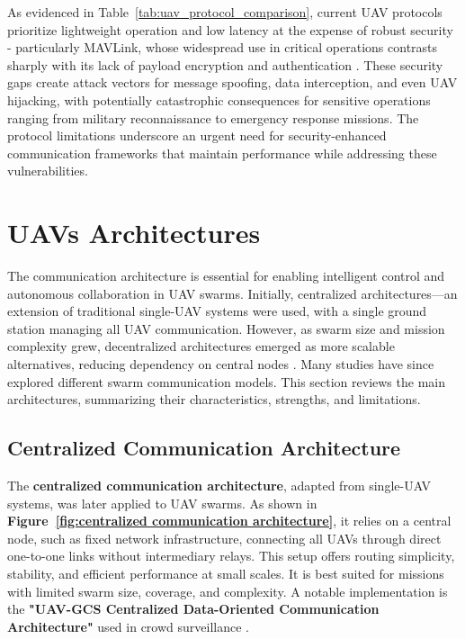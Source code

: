 As evidenced in Table~\ref{tab:uav_protocol_comparison}, current UAV protocols prioritize lightweight operation and low latency at the expense of robust security - particularly MAVLink, whose widespread use in critical operations contrasts sharply with its lack of payload encryption and authentication \cite{khan2020emerging}. These security gaps create attack vectors for message spoofing, data interception, and even UAV hijacking, with potentially catastrophic consequences for sensitive operations ranging from military reconnaissance to emergency response missions. The protocol limitations underscore an urgent need for security-enhanced communication frameworks that maintain performance while addressing these vulnerabilities.








\section{UAVs Architectures}



The communication architecture is essential for enabling intelligent control and autonomous collaboration in UAV swarms. Initially, centralized architectures—an extension of traditional single-UAV systems were used, with a single ground station managing all UAV communication. However, as swarm size and mission complexity grew, decentralized architectures emerged as more scalable alternatives, reducing dependency on central nodes \cite{Cao2012}. Many studies have since explored different swarm communication models. This section reviews the main architectures, summarizing their characteristics, strengths, and limitations.






\subsection{Centralized Communication Architecture}
\label{sec:centralized}

The \textbf{centralized communication architecture}, adapted from single-UAV systems, was later applied to UAV swarms. As shown in \textbf{Figure~\ref{fig:centralized communication architecture}}, it relies on a central node, such as fixed network infrastructure, connecting all UAVs through direct one-to-one links without intermediary relays. This setup offers routing simplicity, stability, and efficient performance at small scales. It is best suited for missions with limited swarm size, coverage, and complexity. A notable implementation is the \textbf{"UAV-GCS Centralized Data-Oriented Communication Architecture"} used in crowd surveillance \cite{Chen2020}.


